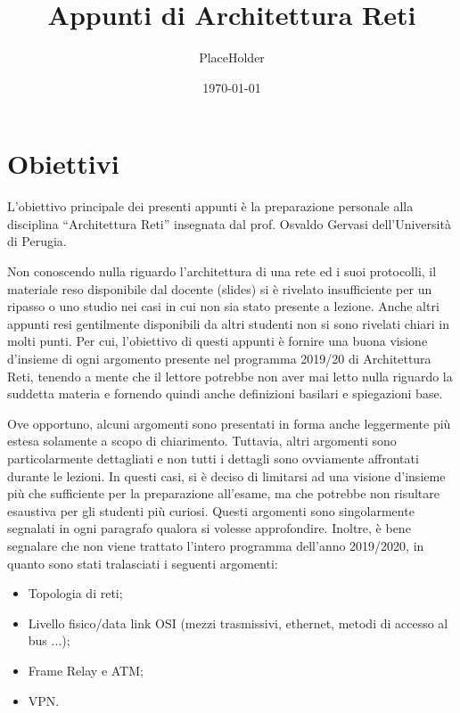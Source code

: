 \documentclass{article}
\title{Appunti di Architettura Reti}
\author{PlaceHolder}
\date{\today}
\begin{document}
    \maketitle

    \section*{Obiettivi}
    L’obiettivo principale dei presenti appunti è la preparazione personale alla disciplina
    “Architettura Reti” insegnata dal prof. Osvaldo Gervasi dell’Università di Perugia.\newline

    Non conoscendo nulla riguardo l’architettura di una rete ed i suoi protocolli, il materiale reso
    disponibile dal docente (slides) si è rivelato insufficiente per un ripasso o uno studio nei casi in
    cui non sia stato presente a lezione. Anche altri appunti resi gentilmente disponibili da altri
    studenti non si sono rivelati chiari in molti punti.\newline\newline
    Per cui, l’obiettivo di questi appunti è fornire una buona visione d’insieme di ogni argomento
    presente nel programma 2019/20 di Architettura Reti, tenendo a mente che il lettore potrebbe
    non aver mai letto nulla riguardo la suddetta materia e fornendo quindi anche definizioni
    basilari e spiegazioni base.\newline

    Ove opportuno, alcuni argomenti sono presentati in forma anche leggermente più estesa
    solamente a scopo di chiarimento. Tuttavia, altri argomenti sono particolarmente dettagliati e
    non tutti i dettagli sono ovviamente affrontati durante le lezioni. In questi casi, si è deciso di
    limitarsi ad una visione d’insieme più che sufficiente per la preparazione all’esame, ma che
    potrebbe non risultare esaustiva per gli studenti più curiosi. Questi argomenti sono
    singolarmente segnalati in ogni paragrafo qualora si volesse approfondire.\newline\newline
    Inoltre, è bene segnalare che non viene trattato l’intero programma dell’anno 2019/2020, in
    quanto sono stati tralasciati i seguenti argomenti:
    
    \begin{itemize}
        \item Topologia di reti;
        \item Livello fisico/data link OSI (mezzi trasmissivi, ethernet, metodi di accesso al bus ...);
        \item Frame Relay e ATM;
        \item VPN.
    \end{itemize}
\end{document}
